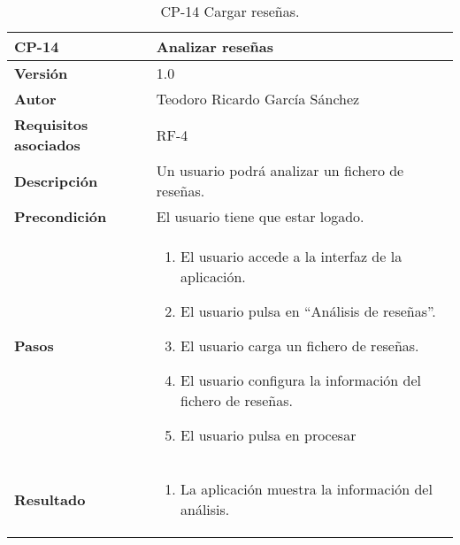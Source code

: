 \begin{table}[p]
	\centering
	\begin{tabularx}{\linewidth}{ p{} p{} }
		\toprule
		\textbf{CP-14}    & \textbf{Analizar reseñas}\\
		\toprule
		\textbf{Versión}              & 1.0    \\
		\textbf{Autor}                & Teodoro Ricardo García Sánchez \\
		\textbf{Requisitos asociados} & RF-4 \\
		\textbf{Descripción}          & Un usuario podrá analizar un fichero de reseñas. \\
		\textbf{Precondición}         & El usuario tiene que estar logado. \\
		\textbf{Pasos}             &
		\begin{enumerate}
			\def\labelenumi{\arabic{enumi}.}
			\tightlist
			\item El usuario accede a la interfaz de la aplicación.
			\item El usuario pulsa en ``Análisis de reseñas''.
			\item El usuario carga un fichero de reseñas.
			\item El usuario configura la información del fichero de reseñas.
			\item El usuario pulsa en procesar
		\end{enumerate}\\
		\textbf{Resultado}          & 
		\begin{enumerate}
			\item La aplicación muestra la información del análisis.
		\end{enumerate}\\
		\bottomrule
	\end{tabularx}
	\caption{CP-14 Cargar reseñas.}
\end{table}

